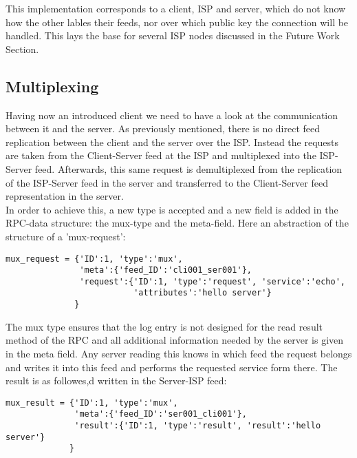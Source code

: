 This implementation corresponds to a client, ISP and server, which do not know how the other lables their feeds, nor over which public key the connection will be handled. This lays the base for several ISP nodes discussed in the Future Work Section. 


\subsection{Multiplexing}
Having now an introduced client we need to have a look at the communication between it and the server. As previously mentioned, there is no direct feed replication between the client and the server over the ISP. Instead the requests are taken from the Client-Server feed at the ISP and multiplexed into the ISP-Server feed. Afterwards, this same request is demultiplexed from the replication of the ISP-Server feed in the server and transferred to the Client-Server feed representation in the server.\\
In order to achieve this, a new type is accepted and a new field is added in the RPC-data structure: the mux-type and the meta-field. Here an abstraction of the structure of a ’mux-request’:\\
\begin{python}
    
\begin{lstlisting}
mux_request = {'ID':1, 'type':'mux', 
               'meta':{'feed_ID':'cli001_ser001'},
               'request':{'ID':1, 'type':'request', 'service':'echo', 
                          'attributes':'hello server'}
              }
\end{lstlisting}
\end{python}

The mux type ensures that the log entry is not designed for the read result method of the RPC and all additional information needed by the server is given in the meta field. Any server reading this knows in which feed the request belongs and writes it into this feed and performs the requested service form there. The result is as followes,d written in the Server-ISP
feed:\\
\begin{python}
    
\begin{lstlisting}
mux_result = {'ID':1, 'type':'mux', 
              'meta':{'feed_ID':'ser001_cli001'},
              'result':{'ID':1, 'type':'result', 'result':'hello server'}
             }
\end{lstlisting}
\end{python}

